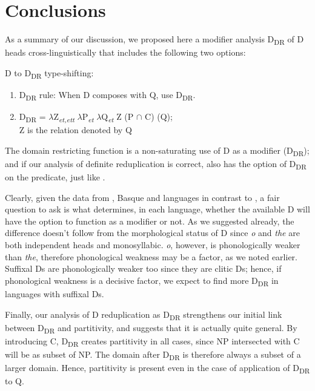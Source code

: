 \documentclass[output=paper,
modfonts
]{langscibook}
\begin{document}
\section{Conclusions}

As a summary of our discussion, we proposed here a modifier analysis D\textsubscript{DR} of D heads cross-linguistically that includes the following two options:

\ea
	D to D\textsubscript{DR} type-shifting:
	\begin{enumerate}
		\item D\textsubscript{DR} rule: When D composes with Q, use D\textsubscript{DR}.
		\item D\textsubscript{DR} = $\lambda$Z\textsubscript{\textit{et,ett}} $\lambda$P\textsubscript{\textit{et}} $\lambda$Q\textsubscript{\textit{et}} Z (P $\cap$ C) (Q);\\ Z is the relation denoted by Q
	\end{enumerate}
\z

The domain restricting function is a non-saturating use of D as a modifier (D\textsubscript{DR}); and if our analysis of  definite reduplication is correct,  also has the option of D\textsubscript{DR} on the predicate, just like . 

Clearly, given the data from , Basque and  languages in contrast to , a fair question to ask is what determines, in each language, whether the available D will have the option to function as a modifier or not. As we suggested already, the difference doesn't follow  from  the morphological status of D since  \textit{o} and  \textit{the} are both independent heads and monosyllabic.  \textit{o}, however, is phonologically weaker than \textit{the}, therefore phonological weakness may be a factor, as we noted earlier. Suffixal Ds are phonologically weaker too since they are clitic Ds; hence, if phonological weakness is a decisive factor, we expect to find more D\textsubscript{DR} in languages with suffixal Ds. 

Finally, our analysis of D reduplication as D\textsubscript{DR} strengthens our initial link between D\textsubscript{DR} and partitivity, and suggests that it is actually quite general. By introducing C, D\textsubscript{DR} creates partitivity in all cases, since NP intersected with C will be as subset of NP. The domain after D\textsubscript{DR} is therefore always a subset of a larger domain. Hence, partitivity is present even in the case of application of D\textsubscript{DR} to Q. 
\end{document}
